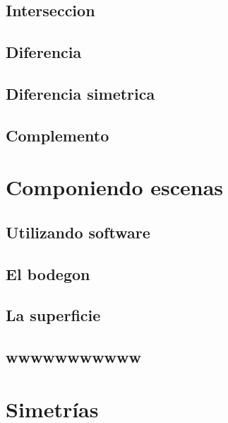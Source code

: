 \documentclass[
  16pt,
]{krantz}
\theoremstyle{definition}
\theoremstyle{definition}
\theoremstyle{definition}
\theoremstyle{definition}
\theoremstyle{remark}
\begin{document}
\hypertarget{interseccion}{%
\subsection{Interseccion}\label{interseccion}}

\hypertarget{diferencia}{%
\subsection{Diferencia}\label{diferencia}}

\hypertarget{diferencia-simetrica}{%
\subsection{Diferencia simetrica}\label{diferencia-simetrica}}

\hypertarget{complemento}{%
\subsection{Complemento}\label{complemento}}

\hypertarget{componiendo-escenas}{%
\section{Componiendo escenas}\label{componiendo-escenas}}

\hypertarget{utilizando-software}{%
\subsection{Utilizando software}\label{utilizando-software}}

\hypertarget{el-bodegon}{%
\subsection{El bodegon}\label{el-bodegon}}

\hypertarget{la-superficie}{%
\subsection{La superficie}\label{la-superficie}}

\hypertarget{wwwwwwwwwww}{%
\subsection{wwwwwwwwwww}\label{wwwwwwwwwww}}

\hypertarget{simetruxedas}{%
\section{Simetrías}\label{simetruxedas}}
\end{document}
